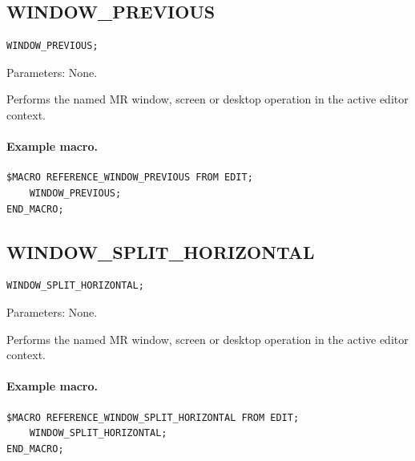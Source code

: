 \documentclass[a4paper,10pt,twoside,openany]{book}
\newenvironment{mrmacextension}{\begin{changebar}}{\end{changebar}}
\begin{document}
\begin{mrmacextension}
\label{prim:procedure-window-previous}
\subsection*{WINDOW\_PREVIOUS}
\begin{verbatim}
WINDOW_PREVIOUS;
\end{verbatim}
Parameters: None.

Performs the named MR window, screen or desktop operation in the active editor context.

\paragraph{Example macro.}
\begin{verbatim}
$MACRO REFERENCE_WINDOW_PREVIOUS FROM EDIT;
    WINDOW_PREVIOUS;
END_MACRO;
\end{verbatim}
\end{mrmacextension}

\begin{mrmacextension}
\label{prim:procedure-window-split-horizontal}
\subsection*{WINDOW\_SPLIT\_HORIZONTAL}
\begin{verbatim}
WINDOW_SPLIT_HORIZONTAL;
\end{verbatim}
Parameters: None.

Performs the named MR window, screen or desktop operation in the active editor context.

\paragraph{Example macro.}
\begin{verbatim}
$MACRO REFERENCE_WINDOW_SPLIT_HORIZONTAL FROM EDIT;
    WINDOW_SPLIT_HORIZONTAL;
END_MACRO;
\end{verbatim}
\end{mrmacextension}
\end{document}
